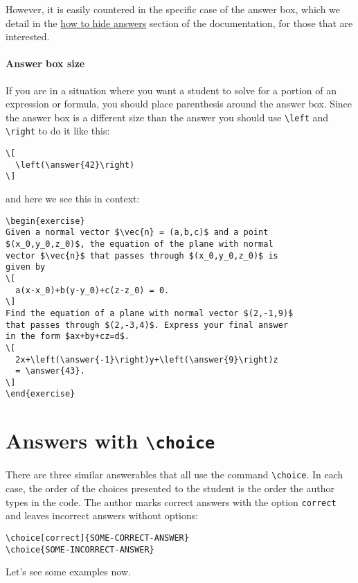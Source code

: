 \documentclass{ximera}
\begin{document}
However, it is easily countered in the specific case of the answer box,
which we detail in the
\href{https://xronos.clas.ufl.edu/examples/exampleCore/supplemental/hiddenAnswers}{how
  to hide answers} section of the documentation, for those that are interested.

\paragraph{Answer box size}
If you are in a situation where you want a student to solve for a portion
of an expression or formula, you should place parenthesis around the answer
box. Since the answer box is a different size than the answer you should use
\verb!\left! and \verb!\right! to do it like
this:
\begin{verbatim}
\[
  \left(\answer{42}\right)
\]
\end{verbatim}
and here we see this in context:
\begin{verbatim}
\begin{exercise}
Given a normal vector $\vec{n} = (a,b,c)$ and a point
$(x_0,y_0,z_0)$, the equation of the plane with normal
vector $\vec{n}$ that passes through $(x_0,y_0,z_0)$ is
given by
\[
  a(x-x_0)+b(y-y_0)+c(z-z_0) = 0.
\]
Find the equation of a plane with normal vector $(2,-1,9)$
that passes through $(2,-3,4)$. Express your final answer
in the form $ax+by+cz=d$.
\[
  2x+\left(\answer{-1}\right)y+\left(\answer{9}\right)z
  = \answer{43}.
\]
\end{exercise}
\end{verbatim}

\section{Answers with \texttt{\textbackslash choice}}

There are three similar answerables that all use the command \verb!\choice!. In
each case, the order of the choices presented to the student is the order the
author types in the code. The author marks correct answers with the option
\verb!correct! and leaves incorrect answers without options:
\begin{verbatim}
\choice[correct]{SOME-CORRECT-ANSWER}
\choice{SOME-INCORRECT-ANSWER}
\end{verbatim}
Let's see some examples now.
\end{document}
